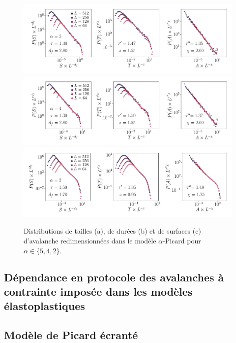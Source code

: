 \begin{figure}[H]
	\centering
	\includegraphics[width=\textwidth]{Chapitre4/Figures/Avalanches/Rescale_Av_alpha5.pdf}
	\includegraphics[width=\textwidth]{Chapitre4/Figures/Avalanches/Rescale_Av_alpha4.pdf}
	\includegraphics[width=\textwidth]{Chapitre4/Figures/Avalanches/Rescale_Av_alpha2.pdf}
	\caption{Distributions de tailles (a), de durées (b) et de surfaces (c) d'avalanche redimensionnées dans le modèle $\alpha$-Picard pour $\alpha \in \{5, 4, 2 \}$.}
	\label{fig:Av_rescale_alpha_annexe}
\end{figure}

\subsection{Dépendance en protocole des avalanches à contrainte imposée dans les modèles élastoplastiques}

\label{sec:article2}



\subsection{Modèle de Picard écranté}

